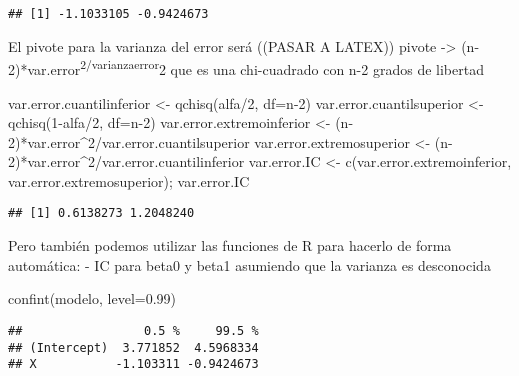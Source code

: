 \documentclass[
]{article}
\newenvironment{Shaded}{\begin{snugshade}}{\end{snugshade}}
\newcommand{\AttributeTok}[1]{\textcolor[rgb]{0.77,0.63,0.00}{#1}}
\newcommand{\DecValTok}[1]{\textcolor[rgb]{0.00,0.00,0.81}{#1}}
\newcommand{\FloatTok}[1]{\textcolor[rgb]{0.00,0.00,0.81}{#1}}
\newcommand{\FunctionTok}[1]{\textcolor[rgb]{0.00,0.00,0.00}{#1}}
\newcommand{\NormalTok}[1]{#1}
\newcommand{\OtherTok}[1]{\textcolor[rgb]{0.56,0.35,0.01}{#1}}
\newcommand{\SpecialCharTok}[1]{\textcolor[rgb]{0.00,0.00,0.00}{#1}}
\begin{document}
\begin{verbatim}
## [1] -1.1033105 -0.9424673
\end{verbatim}

El pivote para la varianza del error será ((PASAR A LATEX)) pivote
-\textgreater{} (n-2)*var.error\textsuperscript{2/varianzaerror}2 que es
una chi-cuadrado con n-2 grados de libertad

\begin{Shaded}
\begin{Highlighting}[]
\NormalTok{var.error.cuantilinferior }\OtherTok{\textless{}{-}} \FunctionTok{qchisq}\NormalTok{(alfa}\SpecialCharTok{/}\DecValTok{2}\NormalTok{, }\AttributeTok{df=}\NormalTok{n}\DecValTok{{-}2}\NormalTok{)}
\NormalTok{var.error.cuantilsuperior }\OtherTok{\textless{}{-}} \FunctionTok{qchisq}\NormalTok{(}\DecValTok{1}\SpecialCharTok{{-}}\NormalTok{alfa}\SpecialCharTok{/}\DecValTok{2}\NormalTok{, }\AttributeTok{df=}\NormalTok{n}\DecValTok{{-}2}\NormalTok{)}
\NormalTok{var.error.extremoinferior }\OtherTok{\textless{}{-}}\NormalTok{ (n}\DecValTok{{-}2}\NormalTok{)}\SpecialCharTok{*}\NormalTok{var.error}\SpecialCharTok{\^{}}\DecValTok{2}\SpecialCharTok{/}\NormalTok{var.error.cuantilsuperior}
\NormalTok{var.error.extremosuperior }\OtherTok{\textless{}{-}}\NormalTok{ (n}\DecValTok{{-}2}\NormalTok{)}\SpecialCharTok{*}\NormalTok{var.error}\SpecialCharTok{\^{}}\DecValTok{2}\SpecialCharTok{/}\NormalTok{var.error.cuantilinferior}
\NormalTok{var.error.IC }\OtherTok{\textless{}{-}} \FunctionTok{c}\NormalTok{(var.error.extremoinferior, var.error.extremosuperior); var.error.IC}
\end{Highlighting}
\end{Shaded}

\begin{verbatim}
## [1] 0.6138273 1.2048240
\end{verbatim}

Pero también podemos utilizar las funciones de R para hacerlo de forma
automática: - IC para beta0 y beta1 asumiendo que la varianza es
desconocida

\begin{Shaded}
\begin{Highlighting}[]
\FunctionTok{confint}\NormalTok{(modelo, }\AttributeTok{level=}\FloatTok{0.99}\NormalTok{)}
\end{Highlighting}
\end{Shaded}

\begin{verbatim}
##                 0.5 %     99.5 %
## (Intercept)  3.771852  4.5968334
## X           -1.103311 -0.9424673
\end{verbatim}
\end{document}
